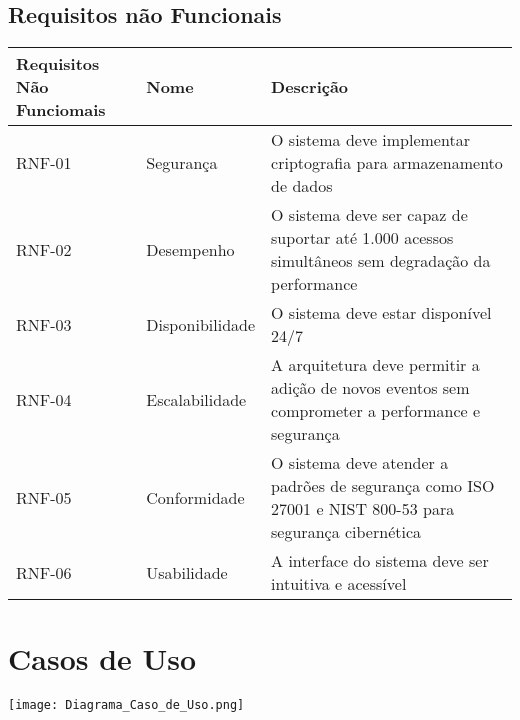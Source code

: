 \documentclass[12pt,a4paper]{article}
\begin{document}

\subsection{Requisitos não Funcionais}

\begin{tabular}{ | m{6em} | m{5cm}| m{20em} |}
  \hline
  Requisitos Não Funciomais & Nome & Descrição \\
  \hline
  RNF-01 & Segurança & O sistema deve implementar criptografia para armazenamento de dados \\ 
  \hline
  RNF-02 & Desempenho & O sistema deve ser capaz de suportar até 1.000 acessos simultâneos sem degradação da performance\\ 
  \hline
  RNF-03 & Disponibilidade & O sistema deve estar disponível 24/7 \\ 
  \hline
  RNF-04 & Escalabilidade & A arquitetura deve permitir a adição de novos eventos sem comprometer a performance e segurança \\ 
  \hline
  RNF-05 & Conformidade & O sistema deve atender a padrões de segurança como ISO 27001 e NIST 800-53 para segurança cibernética \\ 
  \hline
  RNF-06 & Usabilidade & A interface do sistema deve ser intuitiva e acessível \\ 
  \hline
\end{tabular}


\section{Casos de Uso}

\begin{center}
  \texttt{[image: Diagrama\_Caso\_de\_Uso.png]}
\end{center}

\newpage
\end{document}
